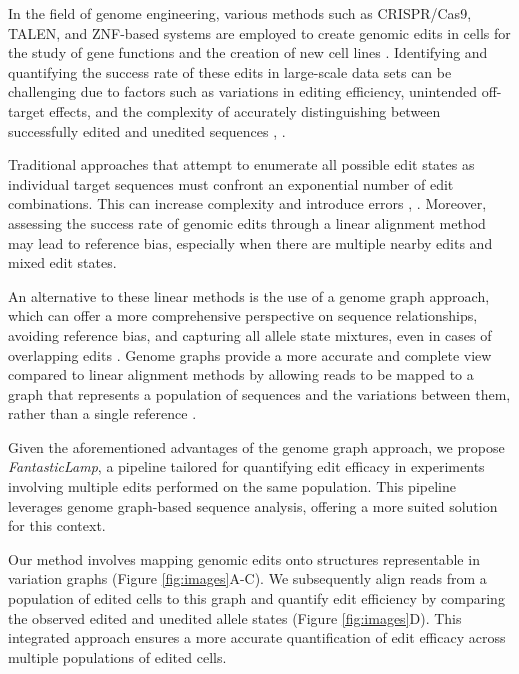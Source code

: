\documentclass{bioinfo}
\theoremstyle{definition}
\begin{document}
In the field of genome engineering, various methods such as CRISPR/Cas9, TALEN, and ZNF-based systems are employed to create genomic edits in cells for the study of gene functions and the creation of new cell lines \citep{gaj2013zfn}.
Identifying and quantifying the success rate of these edits in large-scale data sets can be challenging due to factors such as variations in editing efficiency, unintended off-target effects, and the complexity of accurately distinguishing between successfully edited and unedited sequences \citep{guell2014genome}, \citep{van2020delivery}.

Traditional approaches that attempt to enumerate all possible edit states as individual target sequences must confront an exponential number of edit combinations.
This can increase complexity and introduce errors \citep{huang2013short}, \citep{mun2021leviosam}.
Moreover, assessing the success rate of genomic edits through a linear alignment method may lead to reference bias, especially when there are multiple nearby edits and mixed edit states.

An alternative to these linear methods is the use of a genome graph approach, which can offer a more comprehensive perspective on sequence relationships, avoiding reference bias, and capturing all allele state mixtures, even in cases of overlapping edits \citep{eggertsson2017graphtyper,Martiniano_2020}.
Genome graphs provide a more accurate and complete view compared to linear alignment methods by allowing reads to be mapped to a graph that represents a population of sequences and the variations between them, rather than a single reference \citep{garrison2018variation,paten2017genome}.

Given the aforementioned advantages of the genome graph approach, we propose \textit{FantasticLamp}, a pipeline tailored for quantifying edit efficacy in experiments involving multiple edits performed on the same population.
This pipeline leverages genome graph-based sequence analysis, offering a more suited solution for this context.

Our method involves mapping genomic edits onto structures representable in variation graphs (Figure \ref{fig:images}A-C).
We subsequently align reads from a population of edited cells to this graph and quantify edit efficiency by comparing the observed edited and unedited allele states (Figure \ref{fig:images}D).
This integrated approach ensures a more accurate quantification of edit efficacy across multiple populations of edited cells.
\end{document}
